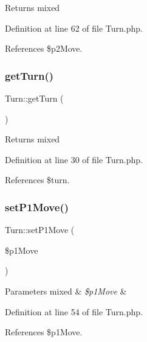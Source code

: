 \begin{DoxyReturn}{Returns}
mixed 
\end{DoxyReturn}


Definition at line 62 of file Turn.\+php.



References \$p2\+Move.

\mbox{\label{class_turn_a1ec561736bfb37b5ce0a6d68d2fb1c8d}} 
\subsubsection{\texorpdfstring{get\+Turn()}{getTurn()}}
{\footnotesize\ttfamily Turn\+::get\+Turn (\begin{DoxyParamCaption}{ }\end{DoxyParamCaption})}

\begin{DoxyReturn}{Returns}
mixed 
\end{DoxyReturn}


Definition at line 30 of file Turn.\+php.



References \$turn.

\mbox{\label{class_turn_a5b0784c88b0fc19df50ec6a426efeb5c}} 
\subsubsection{\texorpdfstring{set\+P1\+Move()}{setP1Move()}}
{\footnotesize\ttfamily Turn\+::set\+P1\+Move (\begin{DoxyParamCaption}\item[{}]{\$p1\+Move }\end{DoxyParamCaption})}


\begin{DoxyParams}[1]{Parameters}
mixed & {\em \$p1\+Move} & \\
\hline
\end{DoxyParams}


Definition at line 54 of file Turn.\+php.



References \$p1\+Move.

\mbox{\label{class_turn_a39595ef14272a1469810b2f12552d1e5}} 
